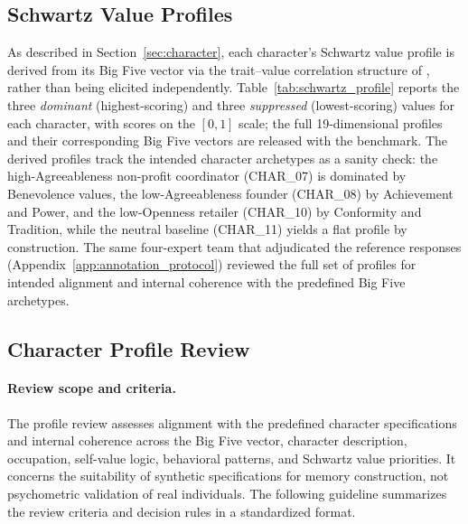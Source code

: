 \documentclass[11pt]{article}
\begin{document}
\subsection{Schwartz Value Profiles}
\label{app:schwartz}

As described in Section~\ref{sec:character}, each character's Schwartz value profile is derived from its Big Five vector via the trait--value correlation structure of \citet{roccas2002bigfive}, rather than being elicited independently. Table~\ref{tab:schwartz_profile} reports the three \emph{dominant} (highest-scoring) and three \emph{suppressed} (lowest-scoring) values for each character, with scores on the $[0,1]$ scale; the full 19-dimensional profiles and their corresponding Big Five vectors are released with the benchmark. The derived profiles track the intended character archetypes as a sanity check: the high-Agreeableness non-profit coordinator (CHAR\_07) is dominated by Benevolence values, the low-Agreeableness founder (CHAR\_08) by Achievement and Power, and the low-Openness retailer (CHAR\_10) by Conformity and Tradition, while the neutral baseline (CHAR\_11) yields a flat profile by construction. The same four-expert team that adjudicated the reference responses (Appendix~\ref{app:annotation_protocol}) reviewed the full set of profiles for intended alignment and internal coherence with the predefined Big Five archetypes.

\subsection{Character Profile Review}
\label{app:profile_review}

\paragraph{Review scope and criteria.}
The profile review assesses alignment with the predefined character specifications and internal coherence across the Big Five vector, character description, occupation, self-value logic, behavioral patterns, and Schwartz value priorities. It concerns the suitability of synthetic specifications for memory construction, not psychometric validation of real individuals. The following guideline summarizes the review criteria and decision rules in a standardized format.
\end{document}
